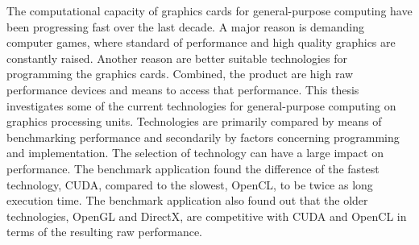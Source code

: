 The computational capacity of graphics cards for general-purpose computing have been progressing fast over the last decade. A major reason is demanding computer games, where standard of performance and high quality graphics are constantly raised. Another reason are better suitable technologies for programming the graphics cards. Combined, the product are high raw performance devices and means to access that performance. This thesis investigates some of the current technologies for general-purpose computing on graphics processing units. Technologies are primarily compared by means of benchmarking performance and secondarily by factors concerning programming and implementation. The selection of technology can have a large impact on performance. The benchmark application found the difference of the fastest technology, CUDA, compared to the slowest, OpenCL, to be twice as long execution time. The benchmark application also found out that the older technologies, OpenGL and DirectX, are competitive with CUDA and OpenCL in terms of the resulting raw performance.%